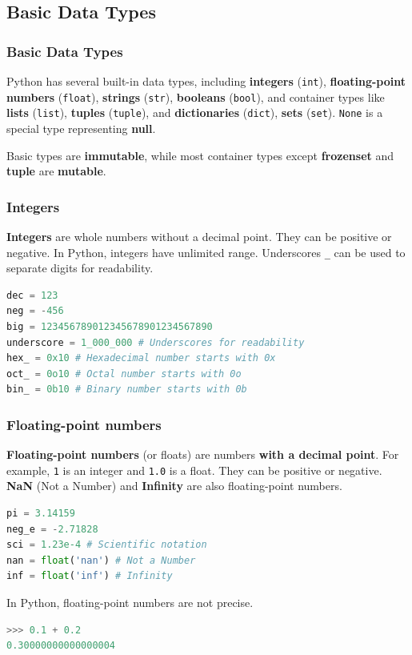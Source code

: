 \documentclass[beamer, en, version=2.0]{huangfusl-template}
\begin{document}
    \subsection{Basic Data Types}
    \begin{frame}[fragile]
        \frametitle{Basic Data Types}

        Python has several built-in data types, including \textbf{integers} ({\footnotesize\verb|int|}), \textbf{floating-point numbers} ({\footnotesize\verb|float|}), \textbf{strings} ({\footnotesize\verb|str|}), \textbf{booleans} ({\footnotesize\verb|bool|}), and container types like \textbf{lists} ({\footnotesize\verb|list|}), \textbf{tuples} ({\footnotesize\verb|tuple|}), and \textbf{dictionaries} ({\footnotesize\verb|dict|}), \textbf{sets} ({\footnotesize\verb|set|}). {\footnotesize\verb|None|} is a special type representing \textbf{null}.

        Basic types are \textbf{immutable}, while most container types except \textbf{frozenset} and \textbf{tuple} are \textbf{mutable}.
    \end{frame}
    \begin{frame}[fragile]
        \frametitle{Integers}

        \textbf{Integers} are whole numbers without a decimal point. They can be positive or negative. In Python, integers have unlimited range. Underscores {\footnotesize\verb|_|} can be used to separate digits for readability.

\begin{lstlisting}[language=python]
dec = 123
neg = -456
big = 123456789012345678901234567890
underscore = 1_000_000 # Underscores for readability
hex_ = 0x10 # Hexadecimal number starts with 0x
oct_ = 0o10 # Octal number starts with 0o
bin_ = 0b10 # Binary number starts with 0b
\end{lstlisting}
    \end{frame}
    \begin{frame}[fragile]
        \frametitle{Floating-point numbers}

        \textbf{Floating-point numbers} (or floats) are numbers \textbf{with a decimal point}. For example, {\footnotesize\verb|1|} is an integer and  {\footnotesize\verb|1.0|} is a float. They can be positive or negative. \textbf{NaN} (Not a Number) and \textbf{Infinity} are also floating-point numbers.

\begin{lstlisting}[language=python]
pi = 3.14159
neg_e = -2.71828
sci = 1.23e-4 # Scientific notation
nan = float('nan') # Not a Number
inf = float('inf') # Infinity
\end{lstlisting}

{\color{darkred}In Python, floating-point numbers are not precise.}
\begin{lstlisting}[language=python]
>>> 0.1 + 0.2
0.30000000000000004
\end{lstlisting}
    \end{frame}
\end{document}
